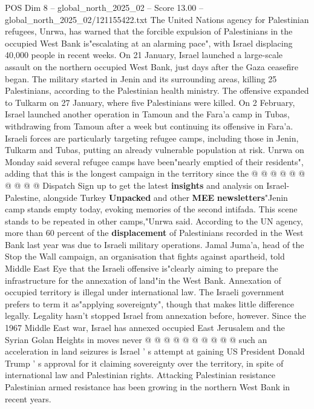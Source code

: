 \begin{textsample}{POS Dim 8 – global\_north\_2025\_02 – Score 13.00 – global\_north\_2025\_02/121155422.txt}  \label{ex:f8_pos_013}
The United Nations agency for Palestinian refugees, Unrwa, has warned that the forcible expulsion of Palestinians in the occupied West Bank is"escalating at an alarming pace", with Israel displacing 40,000 people in recent weeks.
On 21 January, Israel launched a large-scale assault on the northern occupied West Bank, just days after the Gaza ceasefire began.
The military started in Jenin and its surrounding areas, killing 25 Palestinians, according to the Palestinian health ministry.
The offensive expanded to Tulkarm on 27 January, where five Palestinians were killed.
On 2 February, Israel launched another operation in Tamoun and the Fara'a camp in Tubas, withdrawing from Tamoun after a week but continuing its offensive in Fara'a.
Israeli forces are particularly targeting refugee camps, including those in Jenin, Tulkarm and Tubas, putting an already vulnerable population at risk.
Unrwa on Monday said several refugee camps have been"nearly emptied of their residents", adding that this is the longest campaign in the territory since the @ @ @ @ @ @ @ @ @ @ Dispatch Sign up to get the latest \textbf{insights} and analysis on Israel-Palestine, alongside Turkey \textbf{Unpacked} and other \textbf{MEE} \textbf{newsletters}"Jenin camp stands empty today, evoking memories of the second intifada.
This scene stands to be repeated in other camps,"Unrwa said.
According to the UN agency, more than 60 percent of the \textbf{displacement} of Palestinians recorded in the West Bank last year was due to Israeli military operations.
Jamal Juma'a, head of the Stop the Wall campaign, an organisation that fights against apartheid, told Middle East Eye that the Israeli offensive is"clearly aiming to prepare the infrastructure for the annexation of land"in the West Bank.
Annexation of occupied territory is illegal under international law.
The Israeli government prefers to term it as"applying sovereignty", though that makes little difference legally.
Legality hasn't stopped Israel from annexation before, however.
Since the 1967 Middle East war, Israel has annexed occupied East Jerusalem and the Syrian Golan Heights in moves never @ @ @ @ @ @ @ @ @ @ such an acceleration in land seizures is Israel ' s attempt at gaining US President Donald Trump ' s approval for it claiming sovereignty over the territory, in spite of international law and Palestinian rights.
Attacking Palestinian resistance Palestinian armed resistance has been growing in the northern West Bank in recent years.

\end{textsample}
